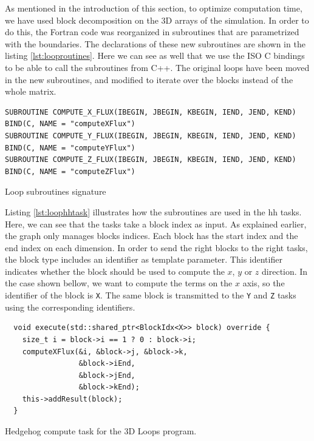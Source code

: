 As mentioned in the introduction of this section, to optimize computation time,
we have used block decomposition on the 3D arrays of the simulation. In order to
do this, the Fortran code was reorganized in subroutines that are parametrized
with the boundaries. The declarations of these new subroutines are shown in the
listing \ref{lst:looproutines}. Here we can see as well that we use the ISO C
bindings to be able to call the subroutines from C++. The original loops have
been moved in the new subroutines, and modified to iterate over the blocks
instead of the whole matrix. \clearpage{}

\begin{listing}[ht!]
\begin{verbatim}
SUBROUTINE COMPUTE_X_FLUX(IBEGIN, JBEGIN, KBEGIN, IEND, JEND, KEND) BIND(C, NAME = "computeXFlux")
SUBROUTINE COMPUTE_Y_FLUX(IBEGIN, JBEGIN, KBEGIN, IEND, JEND, KEND) BIND(C, NAME = "computeYFlux")
SUBROUTINE COMPUTE_Z_FLUX(IBEGIN, JBEGIN, KBEGIN, IEND, JEND, KEND) BIND(C, NAME = "computeZFlux")
\end{verbatim}
\caption{Loop subroutines signature}
\label{lst:looproutines}
\end{listing}

Listing \ref{lst:loophhtask} illustrates how the subroutines are used in the
\gls{hh} tasks. Here, we can see that the tasks take a block index as input. As
explained earlier, the graph only manages blocks indices. Each block has the
start index and the end index on each dimension. In order to send the right
blocks to the right tasks, the block type includes an identifier as template
parameter. This identifier indicates whether the block should be used to
compute the $x$, $y$ or $z$ direction. In the case shown bellow, we want to
compute the terms on the $x$ axis, so the identifier of the block is \texttt{X}.
The same block is transmitted to the \texttt{Y} and \texttt{Z} tasks
using the corresponding identifiers.

\begin{listing}[ht!]
\begin{verbatim}
  void execute(std::shared_ptr<BlockIdx<X>> block) override {
    size_t i = block->i == 1 ? 0 : block->i;
    computeXFlux(&i, &block->j, &block->k,
                 &block->iEnd,
                 &block->jEnd,
                 &block->kEnd);
    this->addResult(block);
  }
\end{verbatim}
\caption{Hedgehog compute task for the 3D Loops program.}
\label{lst:loophhtask}
\end{listing}

